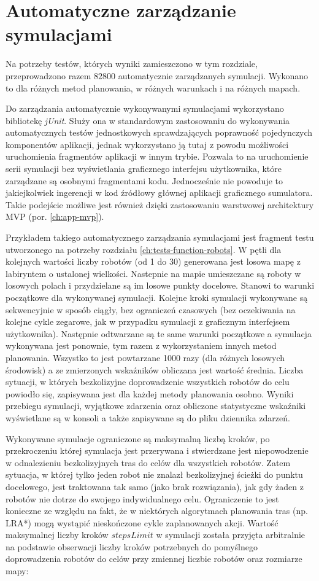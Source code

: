 \section{Automatyczne zarządzanie symulacjami}
Na potrzeby testów, których wyniki zamieszczono w tym rozdziale, przeprowadzono razem $82 800$ automatycznie zarządzanych symulacji. Wykonano to dla różnych metod planowania, w różnych warunkach i na różnych mapach.

Do zarządzania automatycznie wykonywanymi symulacjami wykorzystano bibliotekę {\it jUnit}. Służy ona w standardowym zastosowaniu do wykonywania automatycznych testów jednostkowych sprawdzających poprawność pojedynczych komponentów aplikacji, jednak wykorzystano ją tutaj z powodu możliwości uruchomienia fragmentów aplikacji w innym trybie. Pozwala to na uruchomienie serii symulacji bez wyświetlania graficznego interfejsu użytkownika, które zarządzane są osobnymi fragmentami kodu. Jednocześnie nie powoduje to jakiejkolwiek ingerencji w kod źródłowy głównej aplikacji graficznego sumulatora.
Takie podejście możliwe jest również dzięki zastosowaniu warstwowej architektury MVP (por. \ref{ch:app-mvp}).

Przykładem takiego automatycznego zarządzania symulacjami jest fragment testu utworzonego na potrzeby rozdziału \ref{ch:tests-function-robots}.
W pętli dla kolejnych wartości liczby robotów (od 1 do 30) generowana jest losowa mapę z labiryntem o ustalonej wielkości.
Nastepnie na mapie umieszczane są roboty w losowych polach i przydzielane są im losowe punkty docelowe.
Stanowi to warunki początkowe dla wykonywanej symulacji. Kolejne kroki symulacji wykonywane są sekwencyjnie w sposób ciągły, bez ograniczeń czasowych (bez oczekiwania na kolejne cykle zegarowe, jak w przypadku symulacji z graficznym interfejsem użytkownika).
Następnie odtwarzane są te same warunki początkowe a symulacja wykonywana jest ponownie, tym razem z wykorzystaniem innych metod planowania.
Wszystko to jest powtarzane 1000 razy (dla różnych losowych środowisk) a ze zmierzonych wskaźników obliczana jest wartość średnia.
Liczba sytuacji, w których bezkolizyjne doprowadzenie wszystkich robotów do celu powiodło się, zapisywana jest dla każdej metody planowania osobno.
Wyniki przebiegu symulacji, wyjątkowe zdarzenia oraz obliczone statystyczne wskaźniki wyświetlane są w konsoli a także zapisywane są do pliku dziennika zdarzeń.

Wykonywane symulacje ograniczone są maksymalną liczbą kroków, po przekroczeniu której symulacja jest przerywana i stwierdzane jest niepowodzenie w odnalezieniu bezkolizyjnych tras do celów dla wszystkich robotów.
Zatem sytuacja, w której tylko jeden robot nie znalazł bezkolizyjnej ścieżki do punktu docelowego, jest traktowana tak samo (jako brak rozwiązania), jak gdy żaden z robotów nie dotrze do swojego indywidualnego celu.
Ograniczenie to jest konieczne ze względu na fakt, że w niektórych algorytmach planowania tras (np. LRA*) mogą wystąpić nieskończone cykle zaplanowanych akcji.
Wartość maksymalnej liczby kroków $stepsLimit$ w symulacji została przyjęta arbitralnie na podstawie obserwacji liczby kroków potrzebnych do pomyślnego doprowadzenia robotów do celów przy zmiennej liczbie robotów oraz rozmiarze mapy:

